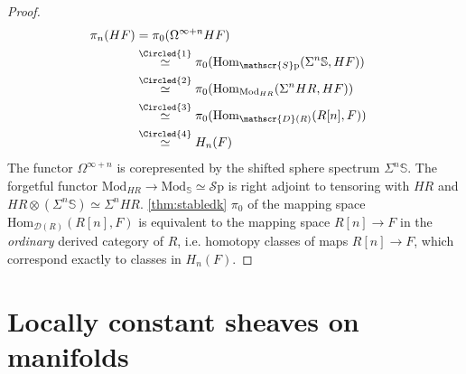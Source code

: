 \documentclass[10pt]{amsart}
\newcommand{\D}{\mathscr{D}}
\newcommand{\bS}{\mathbb{S}}
\newcommand{\Hom}{\mathrm{Hom}}
\newcommand{\Sp}{\mathscr{S}\mathrm{p}}
\newcommand{\Mod}{\mathrm{Mod}}
\theoremstyle{definition}
\theoremstyle{remark}
\numberwithin{equation}{section}
\begin{document}
\begin{proof}
  \begin{align*}
    \pi_n(HF) & =\pi_0(\Omega^{\infty+n}HF)\\
    & \overset{\Circled{1}}{\simeq} \pi_0(\Hom_{\Sp}(\Sigma^n\bS,HF)) \\
    & \overset{\Circled{2}}{\simeq} \pi_0(\Hom_{\Mod_{HR}}(\Sigma^n HR,HF)) & \\
    & \overset{\Circled{3}}{\simeq} \pi_0(\Hom_{\D(R)}(R[n],F))\\
    & \overset{\Circled{4}}{\simeq} H_n(F)
  \end{align*}  The functor $\Omega^{\infty+n}$ is corepresented by the shifted sphere spectrum $\Sigma^n\bS$.  The forgetful functor $\Mod_{HR}\to\Mod_\bS\simeq\Sp$ is right adjoint to tensoring with $HR$ and $HR\otimes(\Sigma^n\bS)\simeq \Sigma^nHR$.  \cref{thm:stabledk}  $\pi_0$ of the mapping space $\Hom_{\D(R)}(R[n],F)$ is equivalent to the mapping space $R[n]\to F$ in the \emph{ordinary} derived category of $R$, i.e. homotopy classes of maps $R[n]\to F$, which correspond exactly to classes in $H_n(F)$.
\end{proof}

\section{Locally constant sheaves on manifolds}\label{sec:constant sheaves}
\end{document}
